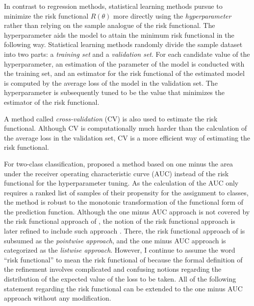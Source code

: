 \documentclass[12pt]{article}
\begin{document}
In contrast to regression methods, statistical learning methods pursue to minimize the risk functional $R(\theta)$ more directly using the {\it hyperparameter} rather than relying on the sample analogue of the risk functional. The hyperparameter aids the model to attain the minimum risk functional in the following way. Statistical learning methods randomly divide the sample dataset into two parts: a {\it training set} and a {\it validation set}. For each candidate value of the hyperparameter, an estimation of the parameter of the model is conducted with the training set, and an estimator for the risk functional of the estimated model is computed by the average loss of the model in the validation set. The hyperparameter is subsequently tuned to be the value that minimizes the estimator of the risk functional.

A method called {\it cross-validation} (CV) is also used to estimate the risk functional. Although CV is computationally much harder than the calculation of the average loss in the validation set, CV is a more efficient way of estimating the risk functional.

For two-class classification, \textcite{Bradley1997} proposed a method based on one minus the area under the receiver operating characteristic curve (AUC) instead of the risk functional for the hyperparameter tuning. As the calculation of the AUC only requires a ranked list of samples of their propensity for the assignment to classes, the method is robust to the monotonic transformation of the functional form of the prediction function. Although the one minus AUC approach is not covered by the risk functional approach of \textcite{Vapnik1999}, the notion of the risk functional approach is later refined to include such approach \parencite{Chen2009}. There, the risk functional approach of \textcite{Vapnik1999} is subsumed as the {\it pointwise approach}, and the one minus AUC approach is categorized as the {\it listwise approach}. However, I continue to assume the word ``risk functional'' to mean the risk functional of \textcite{Vapnik1999} because the formal definition of the refinement involves complicated and confusing notions regarding the distribution of the expected value of the loss to be taken. All of the following statement regarding the risk functional can be extended to the one minus AUC approach without any modification.
\end{document}
